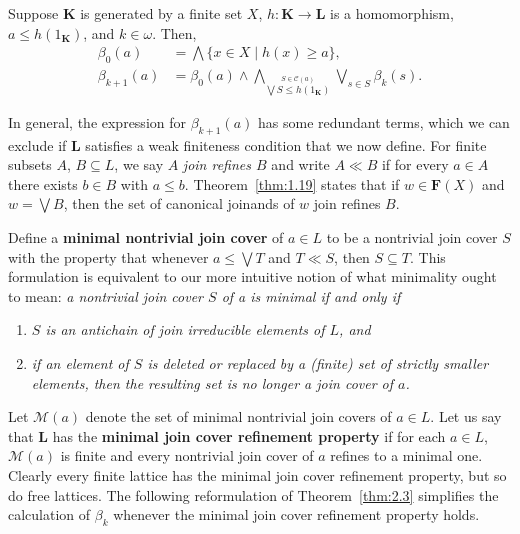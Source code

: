\begin{theorem}\label{thm:2.3}
Suppose $\mathbf K$ is generated by a finite set $X$,
$h \colon \mathbf K \to \mathbf L$ is a homomorphism, $a \leq h(1_{\mathbf K})$, and $k\in \omega$. Then,
\begin{align*}
    \beta_0(a) &= \bigwedge \{x \in X \mid h (x) \geq a\},\\
    \beta_{k+1}(a) &= \beta_0(a) \wedge 
    \bigwedge_{\stackrel{S \in \mathcal C(a)}{\bigvee S \leq h(1_{\mathbf K})}}
    \bigvee_{s \in S} \beta_k(s).
\end{align*}
\end{theorem}
In general, the expression for $\beta_{k+1}(a)$ has some redundant terms, which we can 
exclude if $\mathbf L$ satisfies a weak finiteness condition that we now define.
For finite subsets $A$, $B \subseteq L$, we say $A$ \textit{join refines
$B$} and write $A \ll B$ if for every $a \in A$ there exists $b \in B$ 
with $a \leq b$. Theorem~\ref{thm:1.19} states that if $w \in \mathbf F(X)$ and 
$w = \bigvee B$, then the set of canonical joinands of $w$ join
refines $B$. 

Define a \textbf{minimal nontrivial join cover} of $a \in L$ to be a 
nontrivial join cover $S$ with the property that whenever 
$a\leq \bigvee T$ and $T \ll S$, then
$S \subseteq T$. This formulation is equivalent to our more 
intuitive notion of what minimality ought to mean: \textit{a nontrivial join cover $S$ of a is minimal 
if and only if}
\begin{enumerate}
\item \textit{$S$ is an antichain of join irreducible elements of $L$, and}
\item \textit{if an element of $S$ is deleted or replaced by a (finite) 
  set of strictly smaller elements, then the resulting set is no longer 
  a join cover of $a$.}
\end{enumerate}

Let $\mathcal M(a)$ denote the set of minimal nontrivial join covers of $a \in L$.
Let us say that $\mathbf L$ has the \textbf{minimal join cover refinement property} if for each
$a \in L$, $\mathcal M(a)$ is finite and every nontrivial join cover of $a$ refines 
to a minimal one. Clearly every finite lattice has the minimal join cover refinement 
property, but so do free lattices.  The following reformulation of Theorem~\ref{thm:2.3} 
simplifies the calculation of $\beta_k$ whenever the minimal join cover refinement property holds.

